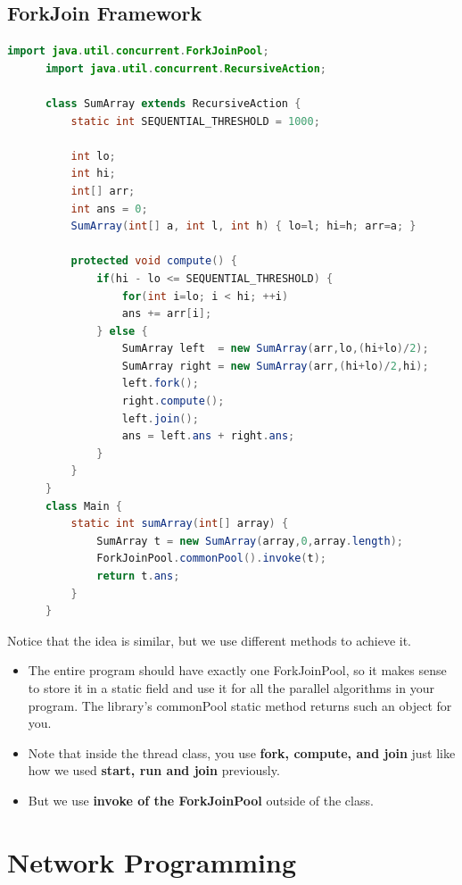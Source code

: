 \documentclass[letterpaper,12pt]{article}
\begin{document}
\subsection{ForkJoin Framework}
\begin{lstlisting}[language=Java]
      import java.util.concurrent.ForkJoinPool;
      import java.util.concurrent.RecursiveAction;
      
      class SumArray extends RecursiveAction {
          static int SEQUENTIAL_THRESHOLD = 1000;
      
          int lo;
          int hi;
          int[] arr;
          int ans = 0;
          SumArray(int[] a, int l, int h) { lo=l; hi=h; arr=a; }
      
          protected void compute() {
              if(hi - lo <= SEQUENTIAL_THRESHOLD) {
                  for(int i=lo; i < hi; ++i)
                  ans += arr[i];
              } else {
                  SumArray left  = new SumArray(arr,lo,(hi+lo)/2);
                  SumArray right = new SumArray(arr,(hi+lo)/2,hi);
                  left.fork();
                  right.compute();
                  left.join();
                  ans = left.ans + right.ans;
              }
          }
      }
      class Main {
          static int sumArray(int[] array) {
              SumArray t = new SumArray(array,0,array.length);
              ForkJoinPool.commonPool().invoke(t);
              return t.ans;
          }
      }

\end{lstlisting}

Notice that the idea is similar, but we use different methods to achieve it.

\begin{itemize}
      \item The entire program should have exactly one ForkJoinPool, so it makes sense to store it in a static field and use it for all the parallel algorithms in your program. The library's commonPool static method returns such an object for you.
      \item Note that inside the thread class, you use \textbf{fork, compute, and join} just like how we used \textbf{start, run and join} previously.
      \item But we use \textbf{invoke of the ForkJoinPool} outside of the class.
\end{itemize}

\section{Network Programming}
\end{document}
